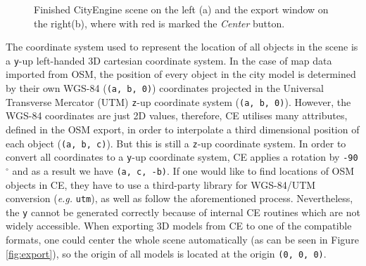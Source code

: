 \begin{figure}[htb]
	\centering
	\caption{Finished CityEngine scene on the left (a) and the export window on the right(b), where with red is marked the \emph{Center} button.}
\end{figure}

The coordinate system used to represent the location of all objects in the scene is a \texttt{y}-up left-handed 3D cartesian coordinate system\cite{ceman}. In the case of map data imported from OSM, the position of every object in the city model is determined by their own WGS-84 (\texttt{(a, b, 0)}) coordinates projected in the Universal Transverse Mercator (UTM) \texttt{z}-up coordinate system (\texttt{(a, b, 0)}). However, the WGS-84 coordinates are just 2D values, therefore, CE utilises many attributes, defined in the OSM export, in order to interpolate a third dimensional position of each object (\texttt{(a, b, c)}). But this is still a \texttt{z}-up coordinate system. In order to convert all coordinates to a \texttt{y}-up coordinate system, CE applies a rotation by \texttt{-90$^{\circ}$} and as a result we have \texttt{(a, c, -b)}. If one would like to find locations of OSM objects in CE, they have to use a third-party library for WGS-84/UTM conversion (\emph{e.g.} \texttt{utm}\cite{utm}), as well as follow the aforementioned process. Nevertheless, the \texttt{y} cannot be generated correctly because of internal CE routines which are not widely accessible. When exporting 3D models from CE to one of the compatible formats, one could center the whole scene automatically (as can be seen in Figure \ref{fig:export}), so the origin of all models is located at the origin \texttt{(0, 0, 0)}.

